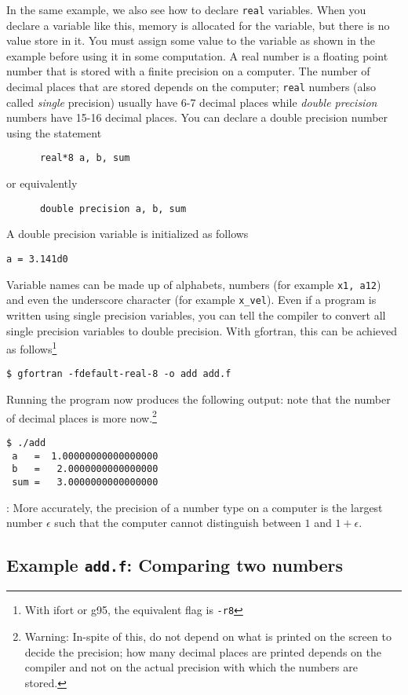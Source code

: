 \documentclass[11pt,oneside]{amsart}
\begin{document}
In the same example, we also see how to declare {\tt real} variables. When you declare a variable like this, memory is allocated for the variable, but there is no value store in it. You must assign some value to the variable as shown in the example before using it in some computation. A real number is a floating point number that is stored with a finite precision on a computer. The number of decimal places that are stored depends on the computer; {\tt real} numbers (also called {\em single} precision) usually have 6-7 decimal places while {\em double precision} numbers have 15-16 decimal places. You can declare a double precision number using the statement
\begin{verbatim}
      real*8 a, b, sum
\end{verbatim}
or equivalently
\begin{verbatim}
      double precision a, b, sum
\end{verbatim}
A double precision variable is initialized as follows
\begin{verbatim}
a = 3.141d0
\end{verbatim}
Variable names can be made up of alphabets, numbers (for example {\tt x1, a12}) and even the underscore character (for example {\tt x\_vel}).  Even if a program is written using single precision variables, you can tell the compiler to convert all single precision variables to double precision. With gfortran, this can be achieved as follows\footnote{With ifort or g95, the equivalent flag is {\tt -r8}}
\begin{verbatim}
$ gfortran -fdefault-real-8 -o add add.f
\end{verbatim}
Running the program now produces the following output: note that the number of decimal places is more now.\footnote{Warning: In-spite of this, do not depend on what is printed on the screen to decide the precision; how many decimal places are printed depends on the compiler and not on the actual precision with which the numbers are stored.}
\begin{verbatim}
$ ./add
 a   =  1.00000000000000000
 b   =   2.0000000000000000
 sum =   3.0000000000000000
 \end{verbatim}

 : More accurately, the precision of a number type on a computer is the largest number $\epsilon$ such that the computer cannot distinguish between $1$ and $1 + \epsilon$.

\subsection{Example {\tt add.f}: Comparing two numbers}
\end{document}
